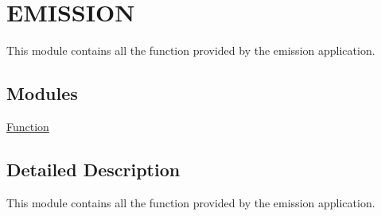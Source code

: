 \hypertarget{group___emission___module}{\section{E\+M\+I\+S\+S\+I\+O\+N}
\label{group___emission___module}
}


This module contains all the function provided by the emission application.  


\subsection*{Modules}
\begin{DoxyCompactItemize}
\item 
\hyperlink{group___emission___function}{Function}
\end{DoxyCompactItemize}


\subsection{Detailed Description}
This module contains all the function provided by the emission application. 

